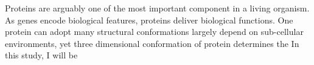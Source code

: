 Proteins are arguably one of the most important component in a living organism. As genes encode biological features, proteins deliver biological functions. One protein can adopt many structural conformations largely depend on sub-cellular environments, yet three dimensional conformation of protein  determines the     In this study, I will be 